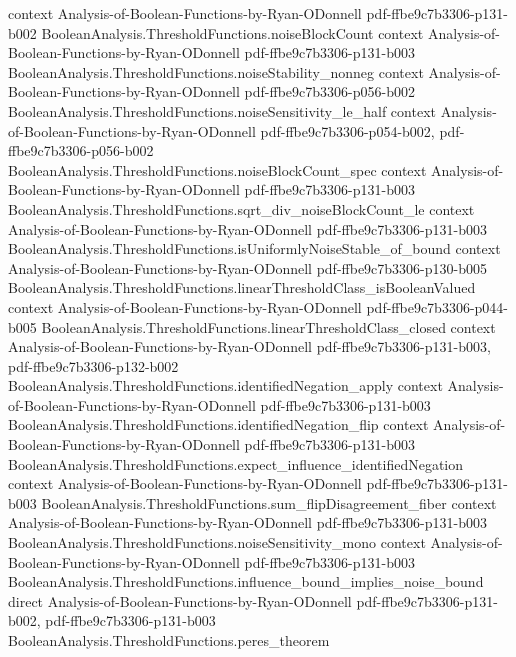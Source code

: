 \begin{theorem}
  {context}
  {Analysis-of-Boolean-Functions-by-Ryan-ODonnell}
  {pdf-ffbe9c7b3306-p131-b002}
\proofstep
  {BooleanAnalysis.ThresholdFunctions.noiseBlockCount}
  {context}
  {Analysis-of-Boolean-Functions-by-Ryan-ODonnell}
  {pdf-ffbe9c7b3306-p131-b003}
\proofstep
  {BooleanAnalysis.ThresholdFunctions.noiseStability_nonneg}
  {context}
  {Analysis-of-Boolean-Functions-by-Ryan-ODonnell}
  {pdf-ffbe9c7b3306-p056-b002}
\proofstep
  {BooleanAnalysis.ThresholdFunctions.noiseSensitivity_le_half}
  {context}
  {Analysis-of-Boolean-Functions-by-Ryan-ODonnell}
  {pdf-ffbe9c7b3306-p054-b002,
    pdf-ffbe9c7b3306-p056-b002}
\proofstep
  {BooleanAnalysis.ThresholdFunctions.noiseBlockCount_spec}
  {context}
  {Analysis-of-Boolean-Functions-by-Ryan-ODonnell}
  {pdf-ffbe9c7b3306-p131-b003}
\proofstep
  {BooleanAnalysis.ThresholdFunctions.sqrt_div_noiseBlockCount_le}
  {context}
  {Analysis-of-Boolean-Functions-by-Ryan-ODonnell}
  {pdf-ffbe9c7b3306-p131-b003}
\proofstep
  {BooleanAnalysis.ThresholdFunctions.isUniformlyNoiseStable_of_bound}
  {context}
  {Analysis-of-Boolean-Functions-by-Ryan-ODonnell}
  {pdf-ffbe9c7b3306-p130-b005}
\proofstep
  {BooleanAnalysis.ThresholdFunctions.linearThresholdClass_isBooleanValued}
  {context}
  {Analysis-of-Boolean-Functions-by-Ryan-ODonnell}
  {pdf-ffbe9c7b3306-p044-b005}
\proofstep
  {BooleanAnalysis.ThresholdFunctions.linearThresholdClass_closed}
  {context}
  {Analysis-of-Boolean-Functions-by-Ryan-ODonnell}
  {pdf-ffbe9c7b3306-p131-b003,
    pdf-ffbe9c7b3306-p132-b002}
\proofstep
  {BooleanAnalysis.ThresholdFunctions.identifiedNegation_apply}
  {context}
  {Analysis-of-Boolean-Functions-by-Ryan-ODonnell}
  {pdf-ffbe9c7b3306-p131-b003}
\proofstep
  {BooleanAnalysis.ThresholdFunctions.identifiedNegation_flip}
  {context}
  {Analysis-of-Boolean-Functions-by-Ryan-ODonnell}
  {pdf-ffbe9c7b3306-p131-b003}
\proofstep
  {BooleanAnalysis.ThresholdFunctions.expect_influence_identifiedNegation}
  {context}
  {Analysis-of-Boolean-Functions-by-Ryan-ODonnell}
  {pdf-ffbe9c7b3306-p131-b003}
\proofstep
  {BooleanAnalysis.ThresholdFunctions.sum_flipDisagreement_fiber}
  {context}
  {Analysis-of-Boolean-Functions-by-Ryan-ODonnell}
  {pdf-ffbe9c7b3306-p131-b003}
\proofstep
  {BooleanAnalysis.ThresholdFunctions.noiseSensitivity_mono}
  {context}
  {Analysis-of-Boolean-Functions-by-Ryan-ODonnell}
  {pdf-ffbe9c7b3306-p131-b003}
\proofstep
  {BooleanAnalysis.ThresholdFunctions.influence_bound_implies_noise_bound}
  {direct}
  {Analysis-of-Boolean-Functions-by-Ryan-ODonnell}
  {pdf-ffbe9c7b3306-p131-b002,
    pdf-ffbe9c7b3306-p131-b003}
\proofstep
  {BooleanAnalysis.ThresholdFunctions.peres_theorem}

\end{theorem}
